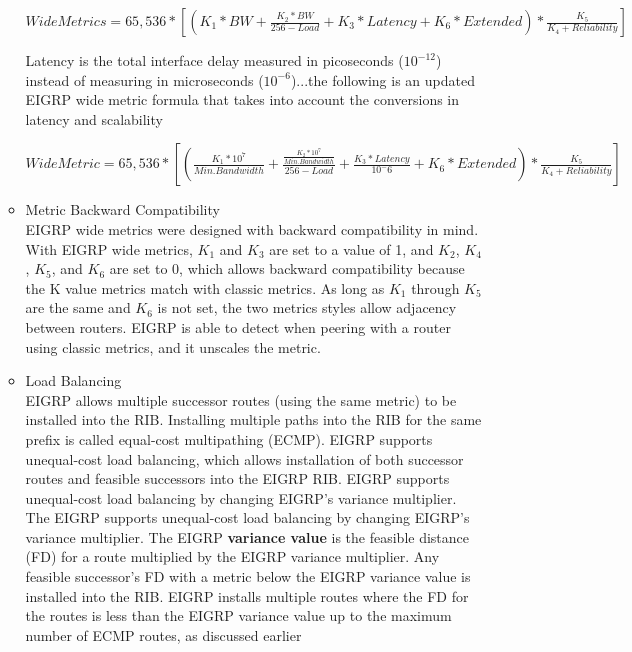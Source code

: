 \documentclass{article}
\begin{document}
\begin{itemize}
\begin{itemize}
				\begin{center}
					$Wide Metrics = 65,536 * [(K_1 * BW + \frac{K_2 * BW}{256 - Load} + K_3 * Latency + K_6 * Extended) * \frac{K_5}{K_4 + Reliability}]$
				\end{center}

				Latency is the total interface delay measured in picoseconds ($10^{-12}$) instead of measuring in microseconds ($10^{-6}$)...the following is an updated EIGRP wide metric formula that takes into account the conversions in latency and scalability	

				\begin{center}
					$Wide Metric = 65,536 * [(\frac{K_1 * 10^7}{Min. Bandwidth} + \frac{\frac{K_2 * 10^7}{Min. Bandwidth}}{256 - Load} + \frac{K_3 * Latency}{10^-6} + K_6 * Extended) * \frac{K_5}{K_4 + Reliability}]$
				\end{center}


			\item Metric Backward Compatibility\\
				EIGRP wide metrics were designed with backward compatibility in mind. With EIGRP wide metrics, $K_1$ and $K_3$ are set to a value of 1, and $K_2$, $K_4$, $K_5$, and $K_6$ are set to 0, which allows backward compatibility because the K value metrics match with classic metrics. As long as $K_1$ through $K_5$ are the same and $K_6$ is not set, the two metrics styles allow adjacency between routers. EIGRP is able to detect when peering with a router using classic metrics, and it unscales the metric.

			\item Load Balancing\\
				EIGRP allows multiple successor routes (using the same metric) to be installed into the RIB. Installing multiple paths into the RIB for the same prefix is called equal-cost multipathing (ECMP).
				EIGRP supports unequal-cost load balancing, which allows installation of both successor routes and feasible successors into the EIGRP RIB. EIGRP supports unequal-cost load balancing by changing EIGRP's variance multiplier. The EIGRP supports unequal-cost load balancing by changing EIGRP's variance multiplier. The EIGRP \textbf{variance value} is the feasible distance (FD) for a route multiplied by the EIGRP variance multiplier. Any feasible successor's FD with a metric below the EIGRP variance value is installed into the RIB. EIGRP installs multiple routes where the FD for the routes is less than the EIGRP variance value up to the maximum number of ECMP routes, as discussed earlier


\end{itemize}
\end{itemize}
\end{document}
